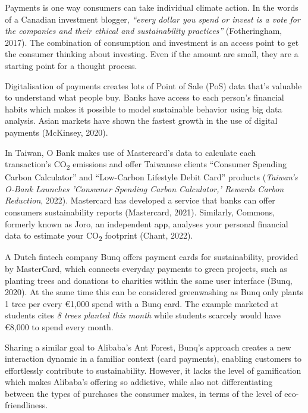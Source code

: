 \documentclass[
  letterpaper,
  DIV=11,
  numbers=noendperiod]{scrartcl}
\begin{document}
Payments is one way consumers can take individual climate action. In the
words of a Canadian investment blogger, \emph{``every dollar you spend
or invest is a vote for the companies and their ethical and
sustainability practices''} (Fotheringham, 2017). The combination of
consumption and investment is an access point to get the consumer
thinking about investing. Even if the amount are small, they are a
starting point for a thought process.

Digitalisation of payments creates lots of Point of Sale (PoS) data
that's valuable to understand what people buy. Banks have access to each
person's financial habits which makes it possible to model sustainable
behavior using big data analysis. Asian markets have shown the fastest
growth in the use of digital payments (McKinsey, 2020).

In Taiwan, O Bank makes use of Mastercard's data to calculate each
transaction's CO\textsubscript{2} emissions and offer Taiwanese clients
``Consumer Spending Carbon Calculator'' and ``Low-Carbon Lifestyle Debit
Card'' products (\emph{Taiwan's {O-Bank} Launches '{Consumer Spending
Carbon Calculator},' Rewards Carbon Reduction}, 2022). Mastercard has
developed a service that banks can offer consumers sustainability
reports (Mastercard, 2021). Similarly, Commons, formerly known as Joro,
an independent app, analyses your personal financial data to estimate
your CO\textsubscript{2} footprint (Chant, 2022).

A Dutch fintech company Bunq offers payment cards for sustainability,
provided by MasterCard, which connects everyday payments to green
projects, such as planting trees and donations to charities within the
same user interface (Bunq, 2020). At the same time this can be
considered greenwashing as Bunq only plants 1 tree per every €1,000
spend with a Bunq card. The example marketed at students cites \emph{8
trees planted this month} while students scarcely would have €8,000 to
spend every month.

Sharing a similar goal to Alibaba's Ant Forest, Bunq's approach creates
a new interaction dynamic in a familiar context (card payments),
enabling customers to effortlessly contribute to sustainability.
However, it lacks the level of gamification which makes Alibaba's
offering so addictive, while also not differentiating between the types
of purchases the consumer makes, in terms of the level of
eco-friendliness.
\end{document}
